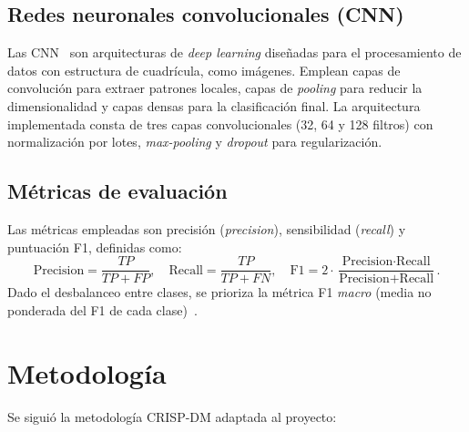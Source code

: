 \documentclass[conference]{IEEEtran}
\begin{document}
\subsection{Redes neuronales convolucionales (CNN)}
Las CNN~\cite{lecun2015deep} son arquitecturas de \emph{deep learning} diseñadas para el procesamiento de datos con estructura de cuadrícula, como imágenes. Emplean capas de convolución para extraer patrones locales, capas de \emph{pooling} para reducir la dimensionalidad y capas densas para la clasificación final. La arquitectura implementada consta de tres capas convolucionales (32, 64 y 128 filtros) con normalización por lotes, \emph{max-pooling} y \emph{dropout} para regularización.

\subsection{Métricas de evaluación}
Las métricas empleadas son precisión (\emph{precision}), sensibilidad (\emph{recall}) y puntuación F1, definidas como:
\[
\text{Precision} = \frac{TP}{TP+FP},\quad
\text{Recall} = \frac{TP}{TP+FN},\quad
\text{F1} = 2\cdot\frac{\text{Precision}\cdot\text{Recall}}{\text{Precision}+\text{Recall}}.
\]
Dado el desbalanceo entre clases, se prioriza la métrica F1 \emph{macro} (media no ponderada del F1 de cada clase)~\cite{grandini2020metrics}.

\section{Metodología}

Se siguió la metodología CRISP-DM adaptada al proyecto:
\end{document}
